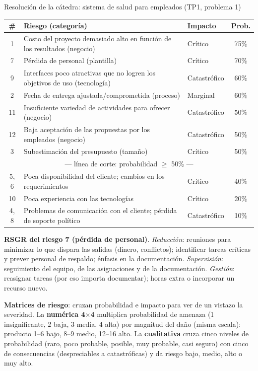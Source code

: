 \documentclass[11pt,a4paper]{article}
\begin{document}
\begin{ejemplo}{Resolución de la cátedra: sistema de salud para empleados (TP1, problema 1)}
\small
\begin{tabularx}{\linewidth}{@{}c X l c@{}}
\toprule
\# & Riesgo (categoría) & Impacto & Prob.\\
\midrule
1 & Costo del proyecto demasiado alto en función de los resultados (negocio) & Crítico & 75\%\\
7 & Pérdida de personal (plantilla) & Crítico & 70\%\\
9 & Interfaces poco atractivas que no logren los objetivos de uso (tecnología) & Catastrófico & 60\%\\
2 & Fecha de entrega ajustada/comprometida (proceso) & Marginal & 60\%\\
11 & Insuficiente variedad de actividades para ofrecer (negocio) & Catastrófico & 50\%\\
12 & Baja aceptación de las propuestas por los empleados (negocio) & Catastrófico & 50\%\\
3 & Subestimación del presupuesto (tamaño) & Crítico & 50\%\\
\multicolumn{4}{c}{\textcolor{critrojo}{--- línea de corte: probabilidad $\ge$ 50\% ---}}\\
5, 6 & Poca disponibilidad del cliente; cambios en los requerimientos & Crítico & 40\%\\
10 & Poca experiencia con las tecnologías & Crítico & 20\%\\
4, 8 & Problemas de comunicación con el cliente; pérdida de soporte político & Catastrófico & 10\%\\
\bottomrule
\end{tabularx}
\par\smallskip
\textbf{RSGR del riesgo 7 (pérdida de personal)}. \emph{Reducción}: reuniones para minimizar lo que dispara las
salidas (dinero, conflictos); identificar tareas críticas y prever personal de respaldo; énfasis en la
documentación. \emph{Supervisión}: seguimiento del equipo, de las asignaciones y de la documentación.
\emph{Gestión}: reasignar tareas (por eso importa documentar); horas extra o incorporar un recurso nuevo.
\end{ejemplo}

\textbf{Matrices de riesgo}: cruzan probabilidad e impacto para ver de un vistazo la severidad. La
\textbf{numérica 4$\times$4} multiplica probabilidad de amenaza (1 insignificante, 2 baja, 3 media, 4 alta) por
magnitud del daño (misma escala): producto 1--6 \textcolor{verde}{bajo}, 8--9 \textcolor{ambar}{medio},
12--16 \textcolor{critrojo}{alto}. La \textbf{cualitativa} cruza cinco niveles de probabilidad (raro, poco
probable, posible, muy probable, casi seguro) con cinco de consecuencias (despreciables a catastróficas) y da
riesgo bajo, medio, alto o muy alto.
\end{document}
